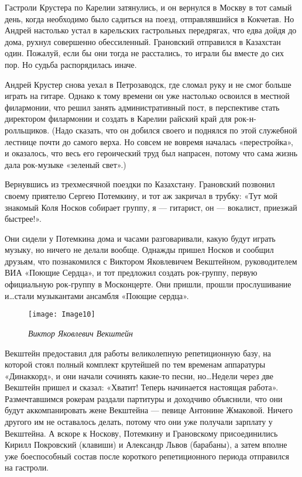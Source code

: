 \documentclass[16pt,a5paper,oneside]{book}
\begin{document}
Гастроли Крустера по Карелии затянулись, и он вернулся в Москву в тот самый день, когда необходимо было садиться на
поезд, отправлявшийся в Кокчетав. Но Андрей настолько устал в карельских гастрольных передрягах, что едва дойдя до дома,
рухнул совершенно обессиленный. Грановский отправился в Казахстан один. Пожалуй, если бы они тогда не расстались, то
играли бы вместе до сих пор. Но судьба распорядилась иначе.

Андрей Крустер снова уехал в Петрозаводск, где сломал руку и не смог больше играть на гитаре. Однако к тому времени он
уже настолько освоился в местной филармонии, что решил занять административный пост, в перспективе стать директором
филармонии и создать в Карелии райский край для рок-н-ролльщиков. (Надо сказать, что он добился своего и поднялся по
этой служебной лестнице почти до самого верха. Но совсем не вовремя началась «перестройка», и оказалось, что весь его
героический труд был напрасен, потому что сама жизнь дала рок-музыке «зеленый свет».)

Вернувшись из трехмесячной поездки по Казахстану. Грановский позвонил своему приятелю Сергею Потемкину, и тот аж
закричал в трубку: «Тут мой знакомый Коля Носков собирает группу, я — гитарист, он — вокалист, приезжай быстрее!».

Они сидели у Потемкина дома и часами разговаривали, какую будут играть музыку, но ничего не делали вообще. Однажды
пришел Носков и сообщил друзьям, что познакомился с Виктором Яковлевичем Векштейном, руководителем ВИА «Поющие Сердца»,
и тот предложил создать рок-группу, первую официальную рок-группу в Москонцерте. Они пришли, прошли прослушивание
и\ldots стали музыкантами ансамбля «Поющие сердца».

\begin{figure}
    \centering
    \texttt{[image: Image10]}
    \caption{\textit{Виктор Яковлевич Векштейн}}
\end{figure}

Векштейн предоставил для работы великолепную репетиционную базу, на которой стоял полный комплект крутейшей по тем
временам аппаратуры «Динаккорд», и они начали сочинять какие-то песни, но\ldots Недели через две Векштейн пришел и
сказал: «Хватит! Теперь начинается настоящая работа». Размечтавшимся рокерам раздали партитуры и доходчиво объяснили,
что они будут аккомпанировать жене Векштейна — певице Антонине Жмаковой. Ничего другого им не оставалось делать, потому
что они уже получали зарплату у Векштейна. А вскоре к Носкову, Потемкину и Грановскому присоединились Кирилл Покровский
(клавиши) и Александр Львов (барабаны), а затем вполне уже боеспособный состав после короткого репетиционного периода
отправился на гастроли.
\end{document}
